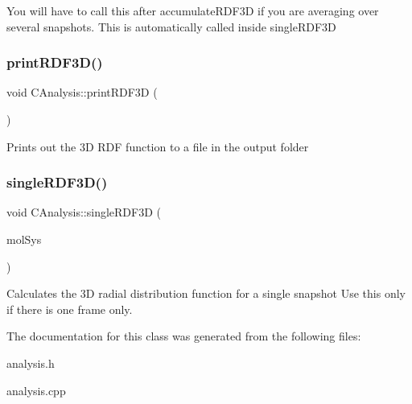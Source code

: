 You will have to call this after accumulate\+R\+D\+F3D if you are averaging over several snapshots. This is automatically called inside single\+R\+D\+F3D \mbox{\label{classCAnalysis_adf290a55dbb19e9150f03d45fb419cee}} 
\subsubsection{\texorpdfstring{print\+R\+D\+F3\+D()}{printRDF3D()}}
{\footnotesize\ttfamily void C\+Analysis\+::print\+R\+D\+F3D (\begin{DoxyParamCaption}{ }\end{DoxyParamCaption})}

Prints out the 3D R\+DF function to a file in the output folder \mbox{\label{classCAnalysis_af98ccc59633e86ecf905367b65c4635e}} 
\subsubsection{\texorpdfstring{single\+R\+D\+F3\+D()}{singleRDF3D()}}
{\footnotesize\ttfamily void C\+Analysis\+::single\+R\+D\+F3D (\begin{DoxyParamCaption}\item[{class \mbox{\hyperlink{classCMolecularSystem}{C\+Molecular\+System}} \&}]{mol\+Sys }\end{DoxyParamCaption})}

Calculates the 3D radial distribution function for a single snapshot Use this only if there is one frame only. 

The documentation for this class was generated from the following files\+:\begin{DoxyCompactItemize}
\item 
analysis.\+h\item 
analysis.\+cpp\end{DoxyCompactItemize}
